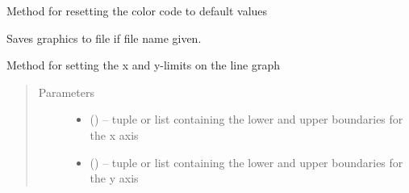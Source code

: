 \documentclass[a4paper,10pt,english]{sphinxmanual}
\begin{document}
\begin{fulllineitems}
\begin{fulllineitems}
\end{fulllineitems}


\begin{fulllineitems}
\label{\detokenize{simulation:biosim.simulation.BioSim.reset_color_code_limits}}
Method for resetting the color code to default values

\end{fulllineitems}


\begin{fulllineitems}
\label{\detokenize{simulation:biosim.simulation.BioSim.save_graphics}}
Saves graphics to file if file name given.

\end{fulllineitems}


\begin{fulllineitems}
\label{\detokenize{simulation:biosim.simulation.BioSim.set_axis_limits}}
Method for setting the x and y-limits on the line graph
\begin{quote}\begin{description}
\item[{Parameters}] \leavevmode\begin{itemize}
\item {} 
 (\sphinxstyleliteralemphasis{, }) -- tuple or list containing the lower and upper boundaries for the
x axis

\item {} 
 (\sphinxstyleliteralemphasis{, }) -- tuple or list containing the lower and upper boundaries for the
y axis

\end{itemize}

\end{description}\end{quote}


\end{fulllineitems}
\end{fulllineitems}
\end{document}
